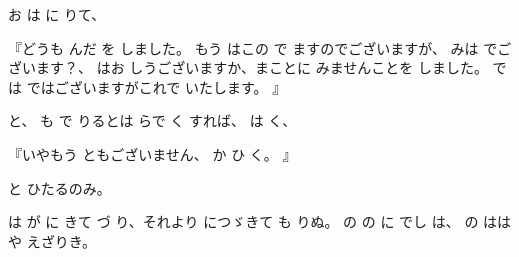お
は
に
りて、

『どうも
んだ
を
しました。
もう
はこの
で
ますのでございますが、
みは
でございます？、
はお
しうございますか、まことに
みませんことを
しました。
では
ではございますがこれで
いたします。
』

と、
も
で
りるとは
らで
く
すれば、
は
く、

『いやもう
ともございません、
か
ひ
く。
』

と
ひたるのみ。

は
が
に
きて
づ
り、それより
につゞきて
も
りぬ。
の
の
に
でし
は、
の
ははや
えざりき。

